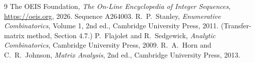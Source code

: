 \documentclass[11pt,a4paper]{article}
\theoremstyle{plain}
\theoremstyle{definition}
\begin{document}
\begin{thebibliography}{9}
 The OEIS Foundation, \emph{The On-Line Encyclopedia of Integer
Sequences}, \url{https://oeis.org}, 2026. Sequence A264003.
 R.~P.~Stanley, \emph{Enumerative Combinatorics}, Volume 1, 2nd ed.,
Cambridge University Press, 2011. (Transfer-matrix method, Section 4.7.)
 P.~Flajolet and R.~Sedgewick, \emph{Analytic Combinatorics}, Cambridge
University Press, 2009.
 R.~A.~Horn and C.~R.~Johnson, \emph{Matrix Analysis}, 2nd ed., Cambridge
University Press, 2013.
\end{thebibliography}
\end{document}
